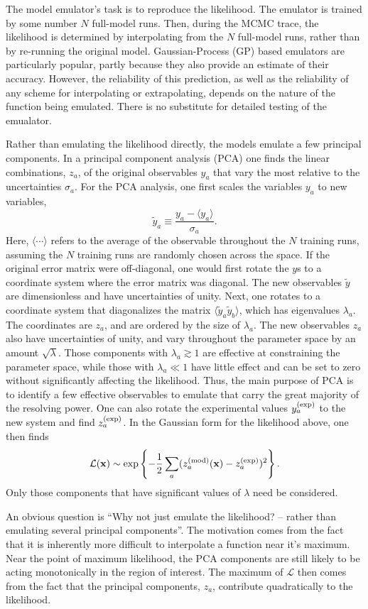 The model emulator's task is to reproduce the likelihood. The emulator is trained by some number $N$ full-model runs. Then, during the MCMC trace, the likelihood is determined by interpolating from the $N$ full-model runs, rather than by re-running the original model. Gaussian-Process (GP) based emulators are particularly popular, partly because they also provide an estimate of their accuracy. However, the reliability of this prediction, as well as the reliability of any scheme for interpolating or extrapolating, depends on the nature of the function being emulated. There is no substitute for detailed testing of the emualator.

Rather than emulating the likelihood directly, the models emulate a few principal components. In a principal component analysis (PCA) one finds the linear combinations, $z_a$, of the original observables $y_a$ that vary the most relative to the uncertainties $\sigma_a$. For the PCA analysis, one first scales the variables $y_a$ to new variables,
\[
\tilde{y}_a\equiv \frac{y_a-\langle y_a\rangle}{\sigma_a}.
\]
Here, $\langle \cdots\rangle$ refers to the average of the observable throughout the $N$ training runs, assuming the $N$ training runs are randomly chosen across the space. If the original error matrix were off-diagonal, one would first rotate the $y$s to a coordinate system where the error matrix was diagonal. The new observables $\tilde{y}$ are dimensionless and have uncertainties of unity. Next, one rotates to a coordinate system that diagonalizes the matrix $\langle \tilde{y}_a\tilde{y}_b\rangle$, which has eigenvalues $\lambda_a$. The coordinates are $z_a$, and are ordered by the size of $\lambda_a$. The new observables $z_a$ also have uncertainties of unity, and vary throughout the parameter space by an amount $\sqrt{\lambda}$. Those components with $\lambda_a\gtrsim 1$ are effective at constraining the parameter space, while those with $\lambda_a\ll 1$ have little effect and can be set to zero without significantly affecting the likelihood. Thus, the main purpose of PCA is to identify a few effective observables to emulate that carry the great majority of the resolving power. One can also rotate the experimental values $y_a^{\rm(exp)}$ to the new system and find $z_a^{\rm(exp)}$. In the Gaussian form for the likelihood above, one then finds
\[
{\mathcal L}({\bf x})\sim \exp\left\{-\frac{1}{2}\sum_a(z^{\rm(mod)}_a({\bf x})-z_a^{\rm(exp)})^2\right\}.
\]
Only those components that have significant values of $\lambda$ need be considered.

An obvious question is ``Why not just emulate the likelihood? -- rather than emulating several principal components''. The motivation comes from the fact that it is inherently more difficult to interpolate a function near it's maximum. Near the point of maximum likelihood, the PCA components are still likely to be acting monotonically in the region of interest. The maximum of ${\mathcal L}$ then comes from the fact that the principal components, $z_a$, contribute quadratically to the likelihood.

